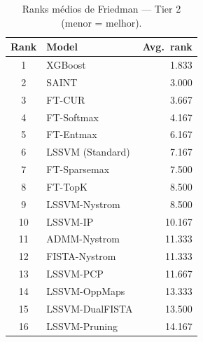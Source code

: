 \begin{table}[ht]
  \centering
  \caption{Ranks médios de Friedman — Tier 2 (menor = melhor).}
  \label{tab:tier2_ranks}
  \begin{tabular}{clr}
    \toprule
    Rank & Model & Avg.\ rank \\
    \midrule
1 & XGBoost & 1.833 \\
2 & SAINT & 3.000 \\
3 & FT-CUR & 3.667 \\
4 & FT-Softmax & 4.167 \\
5 & FT-Entmax & 6.167 \\
6 & LSSVM (Standard) & 7.167 \\
7 & FT-Sparsemax & 7.500 \\
8 & FT-TopK & 8.500 \\
9 & LSSVM-Nystrom & 8.500 \\
10 & LSSVM-IP & 10.167 \\
11 & ADMM-Nystrom & 11.333 \\
12 & FISTA-Nystrom & 11.333 \\
13 & LSSVM-PCP & 11.667 \\
14 & LSSVM-OppMaps & 13.333 \\
15 & LSSVM-DualFISTA & 13.500 \\
16 & LSSVM-Pruning & 14.167 \\
    \bottomrule
  \end{tabular}
\end{table}